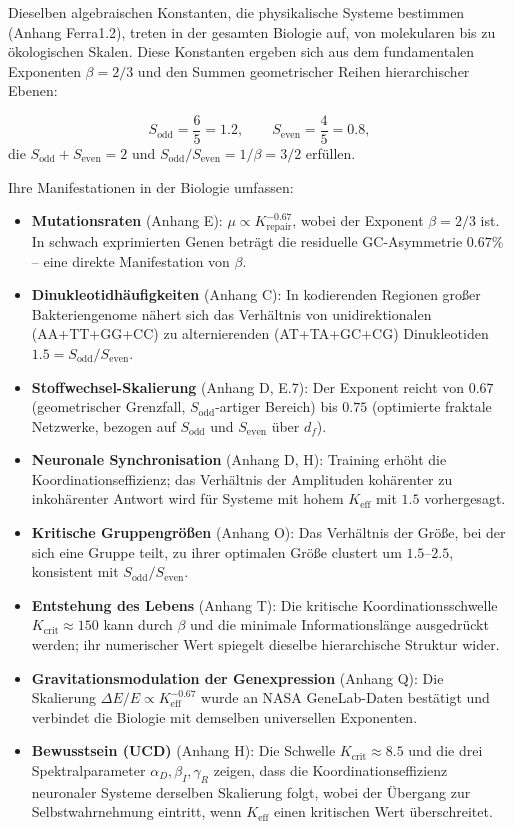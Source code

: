 \documentclass[12pt,a4paper]{article}
\theoremstyle{remark}
\begin{document}
	Dieselben algebraischen Konstanten, die physikalische Systeme bestimmen (Anhang Ferra1.2), treten in der gesamten Biologie auf, von molekularen bis zu ökologischen Skalen. Diese Konstanten ergeben sich aus dem fundamentalen Exponenten $\beta = 2/3$ und den Summen geometrischer Reihen hierarchischer Ebenen:
	
	\[
	S_{\mathrm{odd}} = \frac{6}{5}=1.2,\qquad S_{\mathrm{even}} = \frac{4}{5}=0.8,
	\]
	die $S_{\mathrm{odd}}+S_{\mathrm{even}}=2$ und $S_{\mathrm{odd}}/S_{\mathrm{even}} = 1/\beta = 3/2$ erfüllen.
	
	Ihre Manifestationen in der Biologie umfassen:
	
	\begin{itemize}
		\item \textbf{Mutationsraten} (Anhang E): $\mu \propto K_{\mathrm{repair}}^{-0.67}$, wobei der Exponent $\beta = 2/3$ ist. In schwach exprimierten Genen beträgt die residuelle GC-Asymmetrie $0.67\%$ – eine direkte Manifestation von $\beta$.
		\item \textbf{Dinukleotidhäufigkeiten} (Anhang C): In kodierenden Regionen großer Bakteriengenome nähert sich das Verhältnis von unidirektionalen (AA+TT+GG+CC) zu alternierenden (AT+TA+GC+CG) Dinukleotiden $1.5 = S_{\mathrm{odd}}/S_{\mathrm{even}}$.
		\item \textbf{Stoffwechsel-Skalierung} (Anhang D, E.7): Der Exponent reicht von $0.67$ (geometrischer Grenzfall, $S_{\mathrm{odd}}$-artiger Bereich) bis $0.75$ (optimierte fraktale Netzwerke, bezogen auf $S_{\mathrm{odd}}$ und $S_{\mathrm{even}}$ über $d_f$).
		\item \textbf{Neuronale Synchronisation} (Anhang D, H): Training erhöht die Koordinationseffizienz; das Verhältnis der Amplituden kohärenter zu inkohärenter Antwort wird für Systeme mit hohem $K_{\mathrm{eff}}$ mit $1.5$ vorhergesagt.
		\item \textbf{Kritische Gruppengrößen} (Anhang O): Das Verhältnis der Größe, bei der sich eine Gruppe teilt, zu ihrer optimalen Größe clustert um $1.5$–$2.5$, konsistent mit $S_{\mathrm{odd}}/S_{\mathrm{even}}$.
		\item \textbf{Entstehung des Lebens} (Anhang T): Die kritische Koordinationsschwelle $K_{\mathrm{crit}} \approx 150$ kann durch $\beta$ und die minimale Informationslänge ausgedrückt werden; ihr numerischer Wert spiegelt dieselbe hierarchische Struktur wider.
		\item \textbf{Gravitationsmodulation der Genexpression} (Anhang Q): Die Skalierung $\Delta E/E \propto K_{\mathrm{eff}}^{-0.67}$ wurde an NASA GeneLab-Daten bestätigt und verbindet die Biologie mit demselben universellen Exponenten.
		\item \textbf{Bewusstsein (UCD)} (Anhang H): Die Schwelle $K_{\mathrm{crit}} \approx 8.5$ und die drei Spektralparameter $\alpha_D,\beta_I,\gamma_R$ zeigen, dass die Koordinationseffizienz neuronaler Systeme derselben Skalierung folgt, wobei der Übergang zur Selbstwahrnehmung eintritt, wenn $K_{\mathrm{eff}}$ einen kritischen Wert überschreitet.
	\end{itemize}
	
\end{document}
